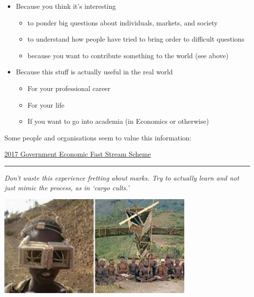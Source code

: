 \documentclass[]{article}
\providecommand{\tightlist}{%
  \setlength{\itemsep}{0pt}\setlength{\parskip}{0pt}}
\begin{document}
\begin{itemize}
\tightlist
\item
  Because you think it's interesting

  \begin{itemize}
  \tightlist
  \item
    to ponder big questions about individuals, markets, and society
  \item
    to understand how people have tried to bring order to difficult
    questions
  \item
    because you want to contribute something to the world (see above)
  \end{itemize}
\item
  Because this stuff is actually useful in the real world

  \begin{itemize}
  \tightlist
  \item
    For your professional career
  \item
    For your life
  \item
    If you want to go into academia (in Economics or otherwise)
  \end{itemize}
\end{itemize}

\bigskip

Some people and organisations seem to value this information:

\href{https://www.gov.uk/government/publications/2017-government-economic-fast-stream-scheme}{2017
Government Economic Fast Stream Scheme}

\begin{center}\rule{0.5\linewidth}{\linethickness}\end{center}

\emph{Don't waste this experience fretting about marks. Try to actually
learn and not just mimic the process, as in `cargo cults.'}

\includegraphics[height=2in]{picsfigs/cargo-cults-336x175.png}
\end{document}
